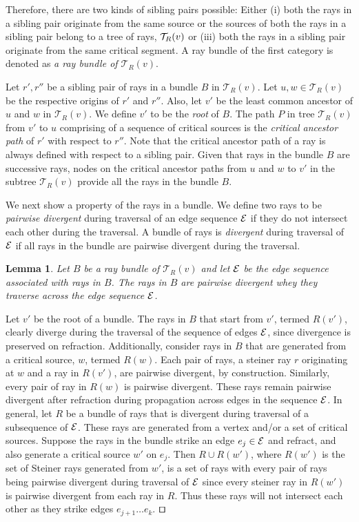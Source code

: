 \documentclass[11pt]{article}
\def\qed{\hbox{\rlap{$\sqcap$}$\sqcup$}}
\def\calT{\mathcal{T}}
\newtheorem{lemma}{Lemma}[section]
\newenvironment{proof}{\par\noindent{\bf Proof:}}{\mbox{}\hfill$\qed$\\}
\begin{document}
Therefore, there are two  kinds of sibling pairs possible:
Either (i) both the rays in a sibling pair originate from the same source or the
 sources of both the rays in a sibling pair belong to a tree of rays, ${\cal T}_R(v)$ or
(iii) both the rays in a sibling pair originate from the same critical segment.
A ray bundle of the first category is denoted as {\it a ray bundle of $\calT_{R}(v)$}. 


Let $r', r''$ be a sibling pair of  rays in a bundle $B$ in $\calT_R(v)$.
Let $u, w \in \calT_R(v)$ be the respective origins of $r'$ and $r''$. 
Also, let $v'$ be the least common ancestor of $u$ and $w$ in $\calT_{R}(v)$.
We define $v'$ to be the {\em root} of $B$.
The path $P$ in tree $\calT_{R}(v)$ from $v'$ to $u$ comprising of a  sequence of critical sources is the {\it critical ancestor path} of $r'$ with respect to $r''$.  
Note that the critical ancestor path of a ray is always defined with respect to a sibling pair.
Given that rays in the bundle $B$ are successive rays,
nodes on the critical ancestor paths from $u$ and $w$ to $v'$
in the subtree $\calT_R(v)$ provide all the rays in the bundle $B$.

We next show a property of the rays in a bundle. We define two rays to be {\em pairwise divergent} during traversal of an edge sequence
${\cal E}$ if they do not intersect each other during the traversal. A bundle of rays is {\em divergent} during traversal of ${\cal E}$
if all rays in the bundle are pairwise divergent during the traversal.

\begin{lemma}
Let $B$ be a ray bundle of $\calT_{R}(v)$ and let ${\cal E}$ be the edge sequence associated with rays in $B$.
The rays in $B$ are pairwise divergent whey they traverse across the edge sequence ${\cal E}$.
\end{lemma}
\begin{proof}
Let $v'$ be the root of a bundle. The rays in $B$ that start from $v'$, termed $R(v')$, clearly diverge during the  traversal of  the sequence of edges ${\cal E}$, since divergence is preserved on refraction. Additionally, consider
rays in $B$ that are generated from a critical source, $w$, termed $R(w)$. Each pair of rays, a steiner ray $r$ originating at $w$ and a ray in $R(v')$, are pairwise divergent, by construction.
Similarly, every pair of ray in $R(w)$ is pairwise divergent.
These rays remain pairwise divergent  after refraction during propagation across edges in the sequence ${\cal E}$.
In general, let $R$ be  a bundle of
rays that is divergent during traversal of a subsequence of ${\cal E}$. These rays are  generated from a vertex and/or  a set of critical sources. Suppose the
rays in the bundle  strike an edge $e_j \in {\cal E}$ and refract, and also generate
a critical source $w' $ on $e_j$. Then $R \cup R(w')$, where $R(w')$ is the set of Steiner rays generated from $w'$,
is a set of rays with every pair of rays being pairwise divergent during traversal of ${\cal E}$ since  every  steiner ray in
$R(w')$ is pairwise divergent from each ray in $R$.
Thus these rays will not intersect each other as they strike edges $e_{j+1} \ldots e_k$.
\end{proof}
\end{document}

